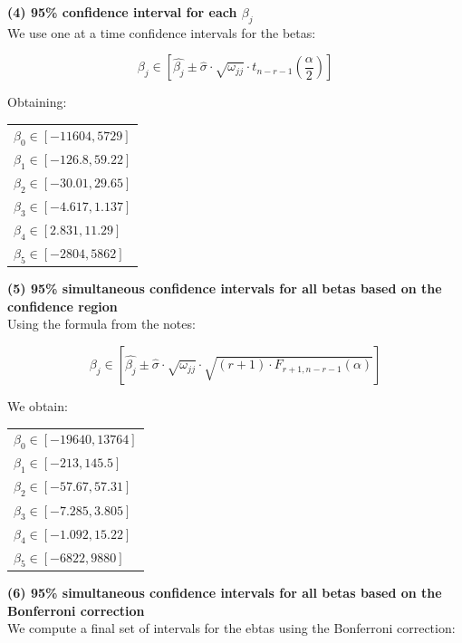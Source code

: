 \documentclass[11pt,a4paper]{article}
\begin{document}
	\textbf{(4) 95\% confidence interval for each $\beta_j$} \\
	
	We use one at a time confidence intervals for the betas:
	
	$$ \beta_j \in [ \hat{\beta_j} \pm \hat{\sigma} \cdot \sqrt{\omega_{jj}} \cdot t_{n-r-1}(\frac{\alpha}{2}) ] $$
	
	Obtaining:
	
	\begin{table}[H] \centering
		\begin{tabular}{l}
			$\beta_0 \in [ -11604 , 5729 ]$ \\
			$\beta_1 \in [ -126.8 , 59.22 ]$ \\
			$\beta_2 \in [ -30.01 , 29.65 ]$ \\
			$\beta_3 \in [ -4.617 , 1.137 ]$ \\
			$\beta_4 \in [ 2.831 , 11.29 ]$ \\
			$\beta_5 \in [ -2804 , 5862 ]$
		\end{tabular}
	\end{table}
	
	\textbf{(5) 95\% simultaneous confidence intervals for all betas based on the confidence region} \\
	
	Using the formula from the notes:
	
	$$ \beta_j \in [ \hat{\beta_j} \pm \hat{\sigma} \cdot \sqrt{\omega_{jj}} \cdot \sqrt{(r+1) \cdot F_{r+1,n-r-1}(\alpha)} ] $$
	
	We obtain:
	
	\begin{table}[H] \centering
		\begin{tabular}{l}
			$\beta_0 \in [ -19640 , 13764 ]$ \\
			$\beta_1 \in [ -213 , 145.5 ]$ \\
			$\beta_2 \in [ -57.67 , 57.31 ]$ \\
			$\beta_3 \in [ -7.285 , 3.805 ]$ \\
			$\beta_4 \in [ -1.092 , 15.22 ]$ \\
			$\beta_5 \in [ -6822 , 9880 ]$
		\end{tabular}
	\end{table}
	
	\textbf{(6) 95\% simultaneous confidence intervals for all betas based on the Bonferroni correction} \\
	
	We compute a final set of intervals for the ebtas using the Bonferroni correction:
	
\end{document}
